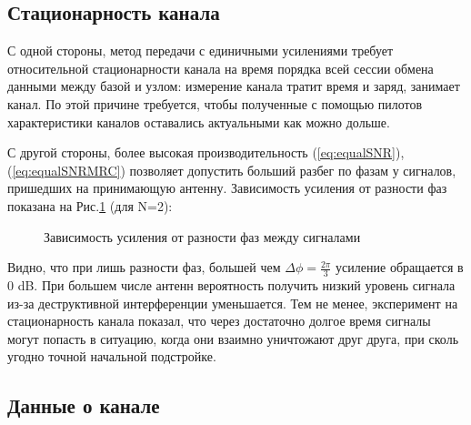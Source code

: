 \documentclass[a4paper,12pt,oneside, abstract=true]{scrartcl}
\begin{document}
\subsection{Стационарность канала}
С одной стороны, метод передачи с единичными усилениями требует относительной стационарности канала на время порядка всей сессии обмена данными между базой и узлом: измерение канала тратит время и заряд, занимает канал. 
По этой причине требуется, чтобы полученные с помощью пилотов характеристики каналов оставались актуальными как можно дольше.

С другой стороны, более высокая производительность (\ref{eq:equalSNR}), (\ref{eq:equalSNRMRC}) позволяет допустить больший разбег по фазам у сигналов, пришедших на принимающую антенну. 
Зависимость усиления от разности фаз показана на Рис.\ref{fig:PDtheory} (для N=2):
\begin{figure}[!htb]
\caption{Зависимость усиления от разности фаз между сигналами}
\label{fig:PDtheory}
\end{figure}

Видно, что при лишь разности фаз, большей чем $\Delta\phi=\frac{2\pi}{3}$ усиление обращается в 0 dB. 
При большем числе антенн вероятность получить низкий уровень сигнала из-за деструктивной интерференции уменьшается. 
Тем не менее, эксперимент на стационарность канала показал, что через достаточно долгое время сигналы могут попасть в ситуацию, когда они взаимно уничтожают друг друга, при сколь угодно точной начальной подстройке.

\subsection{Данные о канале}
\end{document}
